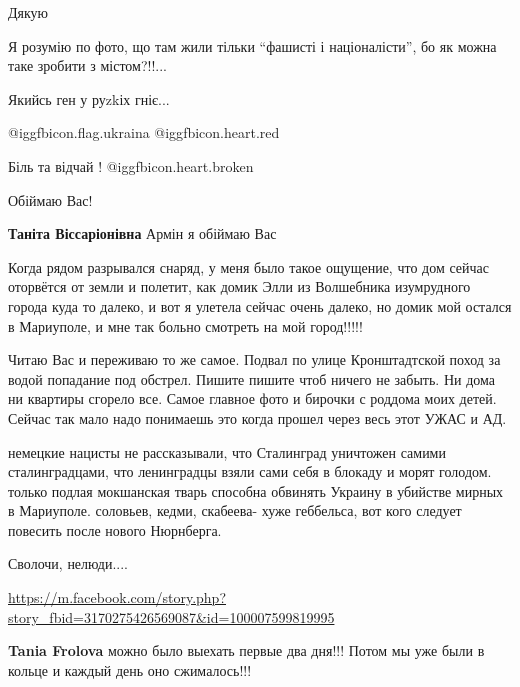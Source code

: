 \begin{itemize}
Дякую


Я розумію по фото, що там жили тільки \enquote{фашисті і націоналісти}, бо як
можна таке зробити з містом?!!...

Якийсь ген у руzkіх гніє...

@igg{fbicon.flag.ukraina} @igg{fbicon.heart.red}

Біль та відчай ! @igg{fbicon.heart.broken} 

Обіймаю Вас!

\begin{itemize} %
\textbf{Таніта Віссаріонівна} Армін я обіймаю Вас


Когда рядом разрывался снаряд, у меня было такое ощущение, что дом сейчас
оторвётся от земли и полетит, как домик Элли из Волшебника изумрудного города
куда то далеко, и вот я улетела сейчас очень далеко, но домик мой остался в
Мариуполе, и мне так больно смотреть на мой город!!!!!

\end{itemize} %


Читаю Вас и переживаю то же самое. Подвал по улице Кронштадтской поход за водой
попадание под обстрел. Пишите пишите чтоб ничего не забыть. Ни дома ни квартиры
сгорело все. Самое главное фото и бирочки с роддома моих детей. Сейчас так мало
надо понимаешь это когда прошел через весь этот УЖАС и АД.


немецкие нацисты не рассказывали, что Сталинград уничтожен самими
сталинградцами, что ленинградцы взяли сами себя в блокаду и морят голодом.
только подлая мокшанская тварь способна обвинять Украину в убийстве мирных в
Мариуполе. соловьев, кедми, скабеева- хуже геббельса, вот кого следует повесить
после нового Нюрнберга.

Сволочи, нелюди....

\url{https://m.facebook.com/story.php?story_fbid=3170275426569087&id=100007599819995}

\textbf{Tania Frolova} можно было выехать первые два дня!!! Потом мы уже были в кольце и каждый день оно сжималось!!!



\end{itemize}

